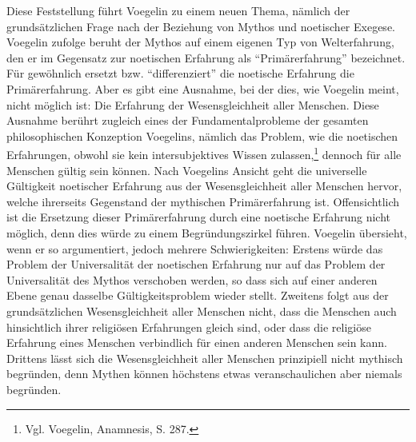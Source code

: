 Diese Feststellung führt Voegelin zu einem neuen Thema, nämlich der
grundsätzlichen Frage nach der Beziehung von Mythos und noetischer Exegese.
Voegelin zufolge beruht der Mythos auf einem eigenen Typ von Welterfahrung,
den er im Gegensatz zur noetischen Erfahrung als "`Primärerfahrung"'
bezeichnet. Für gewöhnlich ersetzt bzw. "`differenziert"' die noetische
Erfahrung die Primärerfahrung.  Aber es gibt eine Ausnahme, bei der dies, wie
Voegelin meint, nicht möglich ist: Die Erfahrung der Wesensgleichheit aller
Menschen. Diese Ausnahme berührt zugleich eines der Fundamentalprobleme der
gesamten philosophischen Konzeption Voegelins, nämlich das Problem, wie die
noetischen Erfahrungen, obwohl sie kein intersubjektives Wissen
zulassen,\footnote{Vgl. Voegelin, Anamnesis, S. 287.} dennoch für alle Menschen
gültig sein können. Nach Voegelins Ansicht geht die universelle Gültigkeit
noetischer Erfahrung aus der Wesensgleichheit aller Menschen hervor, welche
ihrerseits Gegenstand der mythischen Primärerfahrung ist. Offensichtlich ist
die Ersetzung dieser Primärerfahrung durch eine noetische Erfahrung nicht
möglich, denn dies würde zu einem Begründungszirkel führen. Voegelin
übersieht, wenn er so argumentiert, jedoch mehrere Schwierigkeiten: Erstens
würde das Problem der Universalität der noetischen Erfahrung nur auf das
Problem der Universalität des Mythos verschoben werden, so dass sich auf einer
anderen Ebene genau dasselbe Gültigkeitsproblem wieder stellt. Zweitens folgt
aus der grundsätzlichen Wesensgleichheit aller Menschen nicht, dass die
Menschen auch hinsichtlich ihrer religiösen Erfahrungen gleich sind, oder dass
die religiöse Erfahrung eines Menschen verbindlich für einen anderen Menschen
sein kann. Drittens lässt sich die Wesensgleichheit aller Menschen prinzipiell
nicht mythisch begründen, denn Mythen können höchstens etwas veranschaulichen
aber niemals begründen.
 
